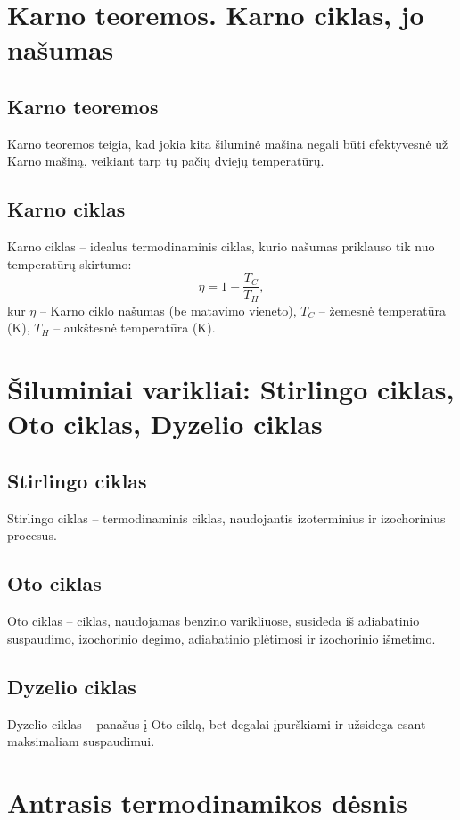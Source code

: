 \documentclass[a4paper,12pt]{article}
\begin{document}
\section{Karno teoremos. Karno ciklas, jo našumas}

\subsection{Karno teoremos}
Karno teoremos teigia, kad jokia kita šiluminė mašina negali būti efektyvesnė už Karno mašiną, veikiant tarp tų pačių dviejų temperatūrų.

\subsection{Karno ciklas}
Karno ciklas – idealus termodinaminis ciklas, kurio našumas priklauso tik nuo temperatūrų skirtumo:
\[
\eta = 1 - \frac{T_C}{T_H},
\]
kur $\eta$ – Karno ciklo našumas (be matavimo vieneto), $T_C$ – žemesnė temperatūra (K), $T_H$ – aukštesnė temperatūra (K).

\section{Šiluminiai varikliai: Stirlingo ciklas, Oto ciklas, Dyzelio ciklas}

\subsection{Stirlingo ciklas}
Stirlingo ciklas – termodinaminis ciklas, naudojantis izoterminius ir izochorinius procesus.

\subsection{Oto ciklas}
Oto ciklas – ciklas, naudojamas benzino varikliuose, susideda iš adiabatinio suspaudimo, izochorinio degimo, adiabatinio plėtimosi ir izochorinio išmetimo.

\subsection{Dyzelio ciklas}
Dyzelio ciklas – panašus į Oto ciklą, bet degalai įpurškiami ir užsidega esant maksimaliam suspaudimui.

\section{Antrasis termodinamikos dėsnis}
\end{document}
